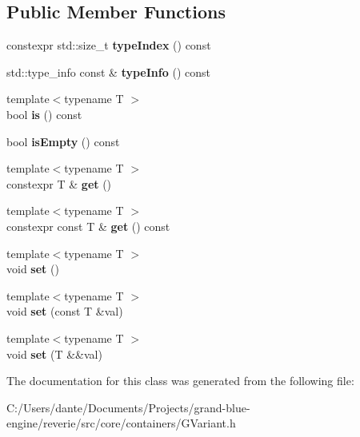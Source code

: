 \subsection*{Public Member Functions}
\begin{DoxyCompactItemize}
\item 
\mbox{\label{classrev_1_1_variant_ac2400b62b3f6c2fec04484e302a89d3d}} 
constexpr std\+::size\+\_\+t {\bfseries type\+Index} () const
\item 
\mbox{\label{classrev_1_1_variant_a2cbbb431a371f773107795659eb79b15}} 
std\+::type\+\_\+info const  \& {\bfseries type\+Info} () const
\item 
\mbox{\label{classrev_1_1_variant_a221f40f72bcbfcb74973eb2a17ad2b24}} 
{\footnotesize template$<$typename T $>$ }\\bool {\bfseries is} () const
\item 
\mbox{\label{classrev_1_1_variant_abee8c38142a64534bb3e17f4b340336e}} 
bool {\bfseries is\+Empty} () const
\item 
\mbox{\label{classrev_1_1_variant_a7e1b35bc566b61d85c51a56c9de24603}} 
{\footnotesize template$<$typename T $>$ }\\constexpr T \& {\bfseries get} ()
\item 
\mbox{\label{classrev_1_1_variant_a6717b1ab93466feb943b4ff15c537fc2}} 
{\footnotesize template$<$typename T $>$ }\\constexpr const T \& {\bfseries get} () const
\item 
\mbox{\label{classrev_1_1_variant_ad3ae8a7ba4a05a5fb71bb77ddfc3ed73}} 
{\footnotesize template$<$typename T $>$ }\\void {\bfseries set} ()
\item 
\mbox{\label{classrev_1_1_variant_a574db7da1012d602411ef0b1d8921deb}} 
{\footnotesize template$<$typename T $>$ }\\void {\bfseries set} (const T \&val)
\item 
\mbox{\label{classrev_1_1_variant_af635315c976b7fe911a0d3265f413d76}} 
{\footnotesize template$<$typename T $>$ }\\void {\bfseries set} (T \&\&val)
\end{DoxyCompactItemize}


The documentation for this class was generated from the following file\+:\begin{DoxyCompactItemize}
\item 
C\+:/\+Users/dante/\+Documents/\+Projects/grand-\/blue-\/engine/reverie/src/core/containers/G\+Variant.\+h\end{DoxyCompactItemize}
